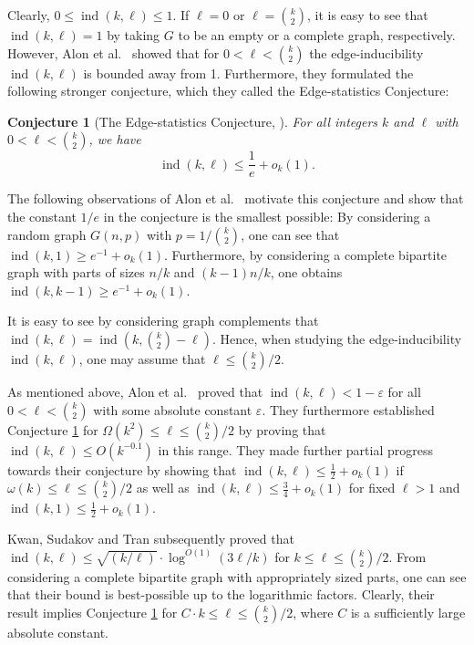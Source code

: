 \documentclass[11pt]{article}
\newtheorem{conjecture}[theorem]{Conjecture}
\theoremstyle{definition}
\numberwithin{equation}{section}
\begin{document}
Clearly, $0\leq \operatorname{ind}(k,\ell)\leq 1$. If $\ell=0$ or $\ell={k\choose 2}$, it is easy to see that $\operatorname{ind}(k,\ell)=1$ by taking $G$ to be an empty or a complete graph, respectively. However, Alon et al.\ \cite{alon-et-al} showed that for $0< \ell< {k\choose 2}$ the edge-inducibility $\operatorname{ind}(k,\ell)$ is bounded away from 1. Furthermore, they formulated the following stronger conjecture, which they called the Edge-statistics Conjecture:

\begin{conjecture}[The Edge-statistics Conjecture, \cite{alon-et-al}]\label{conj-1-e}For all integers $k$ and $\ell$ with $0< \ell<{k\choose 2}$, we have
\[\operatorname{ind}(k,\ell)\leq \frac{1}{e}+o_k(1).\]
\end{conjecture}

The following observations of Alon et al.\ \cite{alon-et-al} motivate this conjecture and show that the constant $1/e$ in the conjecture is the smallest possible: By considering a random graph $G(n,p)$ with $p=1/{k\choose 2}$, one can see that $\operatorname{ind}(k,1)\geq  e^{-1}+o_k(1)$. Furthermore, by considering a complete bipartite graph with parts of sizes $n/k$ and $(k-1)n/k$, one obtains $\operatorname{ind}(k,k-1)\geq  e^{-1}+o_k(1)$.

It is easy to see by considering graph complements that $\operatorname{ind}(k,\ell)=\operatorname{ind}(k,{k\choose 2}-\ell)$. Hence, when studying the edge-inducibility $\operatorname{ind}(k,\ell)$, one may assume that $\ell\leq {k\choose 2}/2$.

As mentioned above, Alon et al.\ \cite{alon-et-al} proved that $\operatorname{ind}(k,\ell)<1-\varepsilon$ for all $0< \ell<{k\choose 2}$ with some absolute constant $\varepsilon$. They furthermore established Conjecture \ref{conj-1-e} for $\Omega(k^2)\leq \ell\leq  {k\choose 2}/2$ by proving that $\operatorname{ind}(k,\ell)\leq O(k^{-0.1})$ in this range. They made further partial progress towards their conjecture by showing that $\operatorname{ind}(k,\ell)\leq \frac{1}{2}+o_k(1)$ if $\omega(k)\leq \ell\leq  {k\choose 2}/2$ as well as $\operatorname{ind}(k,\ell)\leq \frac{3}{4}+o_k(1)$ for fixed $\ell>1$ and $\operatorname{ind}(k,1)\leq \frac{1}{2}+o_k(1)$.

Kwan, Sudakov and Tran \cite{kwan-et-al} subsequently proved that $\operatorname{ind}(k,\ell)\leq \sqrt{(k/\ell)}\cdot \log^{O(1)}(3\ell/k)$ for $k\leq \ell\leq  {k\choose 2}/2$. From considering a complete bipartite graph with appropriately sized parts, one can see that their bound is best-possible up to the logarithmic factors. Clearly, their result implies Conjecture \ref{conj-1-e} for $C\cdot k\leq \ell\leq  {k\choose 2}/2$, where $C$ is a sufficiently large absolute constant.
\end{document}
